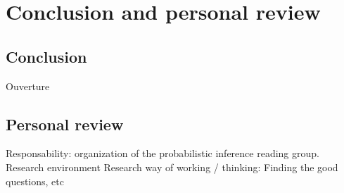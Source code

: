\chapter{Conclusion and personal review}

\section{Conclusion}
Ouverture

\section{Personal review}
Responsability: organization of the probabilistic inference reading group.
Research environment
Research way of working / thinking: Finding the good questions, etc